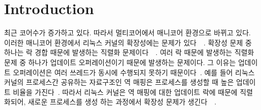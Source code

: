 \section{Introduction} \label{sec:introduction}

\ifkor
최근 코어수가 증가하고 있다. 따라서 멀티코어에서 매니코어 환경으로 바뀌고 있다. 
이러한 매니코어 환경에서 리눅스 커널의 확장성에는 문제가
있다~\cite{SilasBoydWickizer2010LinuxScales48}~\cite{Changwoo2016UMSF}.
확장성 문제 중 하나는 락 경합 때문에 발생하는 직렬화
문제이다~\cite{Matveev2015RLU}~\cite{Dodds2015SCT}.
여러 락 때문에 발생하는 직렬화 문제 중 하나가 업데이트 오퍼레이션이기 때문에 발생하는 문제이다.
그 이유는 업데이트 오퍼레이션은 여러 쓰레드가 동시에 수행되지 못하기
때문이다~\cite{mckenney2011parallel}.
예를 들어 리눅스 커널의 프로세스간 공유하는 자료구조인 역 매핑은 프로세스를 생성할 때 높은 업데이트 비율을
가진다~\cite{SilasBoydWickizerPth}.
따라서 리눅스 커널은 역 매핑에 대한 업데이트 락에 때문에 직렬화되어, 새로운 프로세스를
생성 하는 과정에서 확장성 문제가 생긴다~\cite{Andi2011adding}~\cite{Tim2013adding}.
\else
\fi


